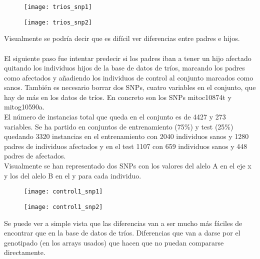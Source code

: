 \begin{figure}[H]
\centering
\begin{minipage}{.5\textwidth}
  \centering
  \texttt{[image: trios\_snp1]}
  \label{fig:snp1-trios}
\end{minipage}%
\begin{minipage}{.5\textwidth}
  \centering
  \texttt{[image: trios\_snp2]}
  \label{fig:snp2-trios}
\end{minipage}
\end{figure}

Visualmente se podría decir que es difícil ver diferencias entre padres e hijos.\\\\

El siguiente paso fue intentar predecir si los padres iban a tener un hijo afectado quitando los individuos hijos de la base de datos de tríos, marcando los padres como afectados y añadiendo los individuos de control al conjunto marcados como sanos. También es necesario borrar dos SNPs, cuatro variables en el conjunto, que hay de más en los datos de tríos. En concreto son los SNPs mitoc10874t y mitog10590a.\\
El número de instancias total que queda en el conjunto es de 4427 y 273 variables. Se ha partido en conjuntos de entrenamiento (75\%) y test (25\%) quedando 3320 instancias en el entrenamiento con 2040 individuos sanos y 1280 padres de individuos afectados y en el test 1107 con 659 individuos sanos y 448 padres de afectados.\\
Visualmente se han representado dos SNPs con los valores del alelo A en el eje x y los del alelo B en el y para cada individuo.

\begin{figure}[H]
\centering
\begin{minipage}{.5\textwidth}
  \centering
  \texttt{[image: control1\_snp1]}
  \label{fig:snp1-control1}
\end{minipage}%
\begin{minipage}{.5\textwidth}
  \centering
  \texttt{[image: control1\_snp2]}
  \label{fig:snp2-control1}
\end{minipage}
\end{figure}

Se puede ver a simple vista que las diferencias van a ser mucho más fáciles de encontrar que en la base de datos de tríos. Diferencias que van a darse por el genotipado (en los arrays usados) que hacen que no puedan compararse directamente.

